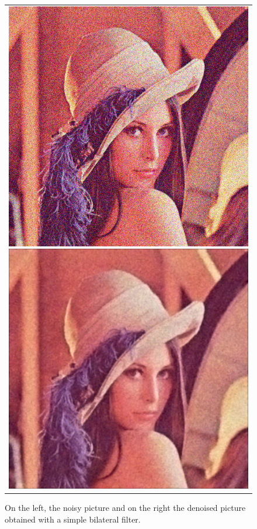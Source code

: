 \documentclass{article}
\begin{document}
\begin{figure}[ht]
\begin{center}
	\begin{tabular}{c}	
		\includegraphics[scale=0.35]{images/noisy.png}
		\includegraphics[scale=0.35]{images/denoised.png}
	\end{tabular}
	\caption{On the left, the noisy picture and on the right the denoised picture obtained with a simple bilateral filter.}
	\label{noisy}
\end{center}
\end{figure}
\end{document}
